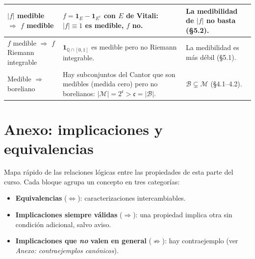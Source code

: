 \documentclass[11pt,twoside]{article}
\newcommand{\Q}{\mathbb{Q}}
\newcommand{\ind}{\mathbf{1}}                 %
\begin{document}
\begin{longtable}{p{} p{} p{}}
\hline
$|f|$ medible $\Rightarrow$ $f$ medible & $f = \ind_{E} - \ind_{E^{c}}$ con $E$ de Vitali: $|f| \equiv 1$ es medible, $f$ no. & La medibilidad de $|f|$ no basta (§5.2).\\
\hline
$f$ medible $\Rightarrow$ $f$ Riemann integrable & $\ind_{\Q \cap [0,1]}$ es medible pero no Riemann integrable. & La medibilidad es m\'as d\'ebil (§5.1).\\
\hline
Medible $\Rightarrow$ boreliano & Hay subconjuntos del Cantor que son medibles (medida cero) pero no borelianos: $|\mathcal{M}| = 2^{\mathfrak{c}} > \mathfrak{c} = |\mathcal{B}|$. & $\mathcal{B} \subsetneq \mathcal{M}$ (§4.1--4.2).\\
\hline
\end{longtable}
\renewcommand{\arraystretch}{1.0}

\newpage
\section{Anexo: implicaciones y equivalencias}

Mapa r\'apido de las relaciones l\'ogicas entre las propiedades de esta parte del curso. Cada bloque agrupa un concepto en tres categor\'ias:
\begin{itemize}[leftmargin=2em]
\item \textbf{Equivalencias} ($\Leftrightarrow$): caracterizaciones intercambiables.
\item \textbf{Implicaciones siempre v\'alidas} ($\Rightarrow$): una propiedad implica otra sin condici\'on adicional, salvo aviso.
\item \textbf{Implicaciones que \emph{no} valen en general} ($\not\Rightarrow$): hay contraejemplo (ver \emph{Anexo: contraejemplos can\'onicos}).
\end{itemize}

\medskip
\end{document}
